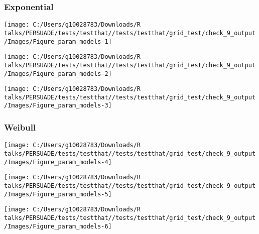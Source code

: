 \documentclass[
]{article}
\begin{document}
\clearpage

\clearpage

\subsubsection{Exponential}\label{exponential}

\begin{flushleft}\texttt{[image: C:/Users/g10028783/Downloads/R talks/PERSUADE/tests/testthat//tests/testthat/grid\_test/check\_9\_output/Images/Figure\_param\_models-1]} \end{flushleft}

\begin{flushleft}\texttt{[image: C:/Users/g10028783/Downloads/R talks/PERSUADE/tests/testthat//tests/testthat/grid\_test/check\_9\_output/Images/Figure\_param\_models-2]} \end{flushleft}

\begin{flushleft}\texttt{[image: C:/Users/g10028783/Downloads/R talks/PERSUADE/tests/testthat//tests/testthat/grid\_test/check\_9\_output/Images/Figure\_param\_models-3]} \end{flushleft}

\clearpage

\subsubsection{Weibull}\label{weibull}

\begin{flushleft}\texttt{[image: C:/Users/g10028783/Downloads/R talks/PERSUADE/tests/testthat//tests/testthat/grid\_test/check\_9\_output/Images/Figure\_param\_models-4]} \end{flushleft}

\begin{flushleft}\texttt{[image: C:/Users/g10028783/Downloads/R talks/PERSUADE/tests/testthat//tests/testthat/grid\_test/check\_9\_output/Images/Figure\_param\_models-5]} \end{flushleft}

\begin{flushleft}\texttt{[image: C:/Users/g10028783/Downloads/R talks/PERSUADE/tests/testthat//tests/testthat/grid\_test/check\_9\_output/Images/Figure\_param\_models-6]} \end{flushleft}
\end{document}
